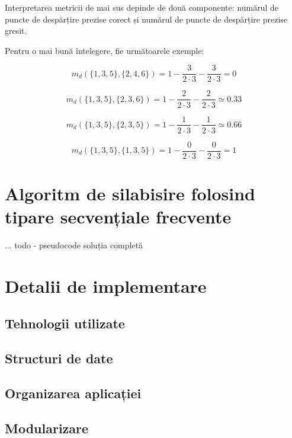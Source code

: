 Interpretarea metricii de mai sus depinde de două componente: numărul de puncte de despărțire prezise corect și numărul de puncte de despărțire prezise gresit.

\begin{ex}
Pentru o mai bună întelegere, fie următoarele exemple:

\begin{equation}
m_d(\{1,3,5\}, \{2,4,6\}) = 1- \frac{3}{2 \cdot 3} - \frac{3}{2 \cdot 3} = 0 
\end{equation}

\begin{equation}
m_d(\{1,3,5\}, \{2,3,6\}) = 1- \frac{2}{2 \cdot 3} - \frac{2}{2 \cdot 3} \simeq 0.33 
\end{equation}

\begin{equation}
m_d(\{1,3,5\}, \{2,3,5\}) = 1- \frac{1}{2 \cdot 3} - \frac{1}{2 \cdot 3} \simeq 0.66 
\end{equation}


\begin{equation}
m_d(\{1,3,5\}, \{1,3,5\}) = 1 - \frac{0}{2 \cdot 3} - \frac{0}{2 \cdot 3} = 1 
\end{equation}


\end{ex} 

\section{Algoritm de silabisire folosind tipare secvențiale frecvente}

... todo - pseudocode soluția completă

\section{Detalii de implementare}
\subsection{Tehnologii utilizate}
\subsection{Structuri de date}
\subsection{Organizarea aplicației}
\subsection{Modularizare}
